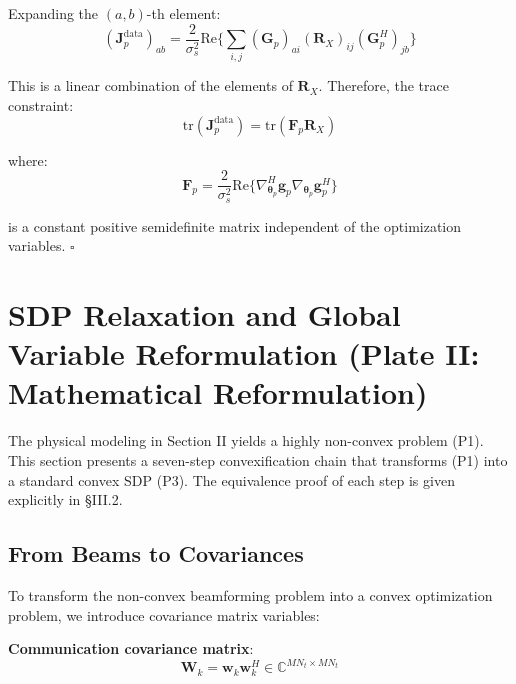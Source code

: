 \documentclass[12pt,a4paper]{article}
\newcommand{\vect}[1]{\mathbf{#1}}
\newcommand{\mat}[1]{\mathbf{#1}}
\newcommand{\tr}{\text{tr}}
\newcommand{\Real}{\text{Re}}
\begin{document}
Expanding the $(a,b)$-th element:
\begin{equation}
(\mat{J}_p^{\text{data}})_{ab} = \frac{2}{\sigma_s^2} \Real\Big\{ \sum_{i,j} (\mat{G}_p)_{ai} (\mat{R}_X)_{ij} (\mat{G}_p^H)_{jb} \Big\}
\end{equation}

This is a linear combination of the elements of $\mat{R}_X$. Therefore, the trace constraint:
\begin{equation}
\tr(\mat{J}_p^{\text{data}}) = \tr(\mat{F}_p \mat{R}_X) \tag{12}
\end{equation}

where:
\begin{equation}
\mat{F}_p = \frac{2}{\sigma_s^2} \Real\Big\{ \nabla_{\boldsymbol{\theta}_p}^H \vect{g}_p \nabla_{\boldsymbol{\theta}_p} \vect{g}_p^H \Big\} \tag{13}
\end{equation}

is a constant positive semidefinite matrix independent of the optimization variables. \hfill$\square$

\section{SDP Relaxation and Global Variable Reformulation (Plate II: Mathematical Reformulation)}

The physical modeling in Section II yields a highly non-convex problem (P1). This section presents a seven-step convexification chain that transforms (P1) into a standard convex SDP (P3). The equivalence proof of each step is given explicitly in §III.2.



\subsection{From Beams to Covariances}

To transform the non-convex beamforming problem into a convex optimization problem, we introduce covariance matrix variables:

\textbf{Communication covariance matrix}:
\begin{equation}
\mat{W}_k = \vect{w}_k \vect{w}_k^H \in \mathbb{C}^{MN_t \times MN_t} \tag{15}
\end{equation}
\end{document}

